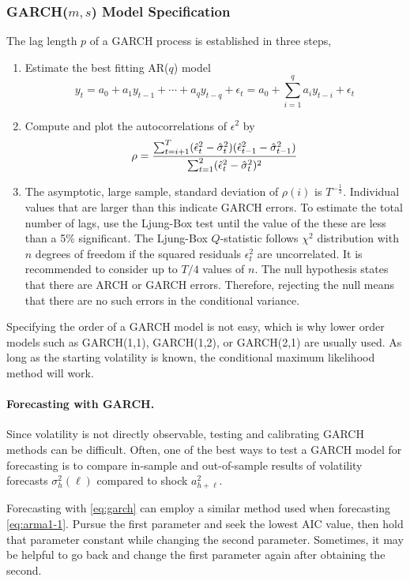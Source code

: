 \subsubsection{GARCH($m, s$) Model Specification}\label{garch-spec}
The lag length $p$ of a GARCH process is established in three steps,
\begin{enumerate}
\item Estimate the best fitting AR($q$) model
\[
y_t = a_0 + a_1 y_{t-1} + \cdots + a_q y_{t-q} + \epsilon_t = a_0 + \sum_{i=1}^q a_i y_{t-i} + \epsilon_t 
\]
\item Compute and plot the autocorrelations of $\epsilon^2$ by 
\[
\rho = {{\sum^T_{t=i+1} (\hat \epsilon^2_t - \hat \sigma^2_t) (\hat \epsilon^2_{t-1} - \hat \sigma^2_{t-1})} \over {\sum^2_{t=1} (\hat \epsilon^2_t - \hat \sigma^2_t)^2}} 
\]
\item The asymptotic, large sample, standard deviation of $\rho(i)$ is $T^{-\frac{1}{2}}$. Individual values that are larger than this indicate GARCH errors. To estimate the total number of lags, use the Ljung-Box test until the value of the these are less than a 5\% significant. The Ljung-Box $Q$-statistic follows $\chi^2$ distribution with $n$ degrees of freedom if the squared residuals $\epsilon^2_t$  are uncorrelated. It is recommended to consider up to $T/4$ values of $n$. The null hypothesis states that there are ARCH or GARCH errors. Therefore, rejecting the null means that there are no such errors in the conditional variance.
\end{enumerate}

Specifying the order of a GARCH model is not easy, which is why lower order models such as GARCH(1,1), GARCH(1,2), or GARCH(2,1) are usually used. As long as the starting volatility is known, the conditional maximum likelihood method will work.

\paragraph{Forecasting with GARCH.}
Since volatility is not directly observable, testing and calibrating GARCH methods can be difficult. Often, one of the best ways to test a GARCH model for forecasting is to compare in-sample and out-of-sample results of volatility forecasts $\sigma^2_h(\ell)$ compared to shock $a^2_{h+\ell}$.

Forecasting with \eqref{eq:garch} can employ a similar method used when forecasting \eqref{eq:arma1-1}. Pursue the first parameter and seek the lowest AIC value, then hold that parameter constant while changing the second parameter. Sometimes, it may be helpful to go back and change the first parameter again after obtaining the second.

